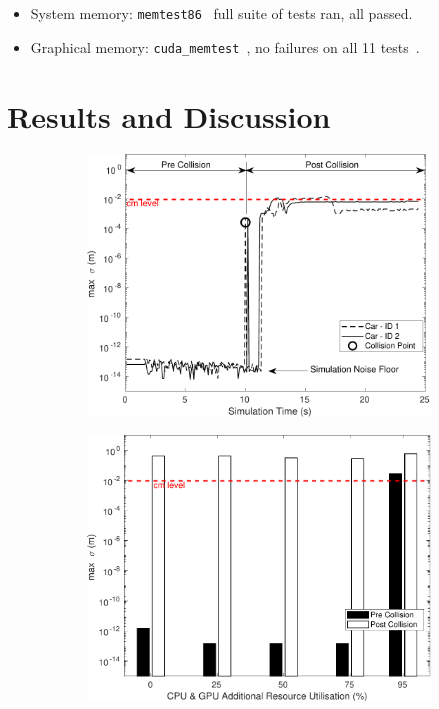 \begin{itemize}[leftmargin=*]
    \item System memory: \texttt{memtest86}~\cite{MemTest86} full suite of tests ran, all passed.
    \item Graphical memory: \texttt{cuda\_memtest}~\cite{cuda_memtest}, no failures on all 11 tests~\cite{shi2009testing}.
\end{itemize}

\section{Results and Discussion}\label{s:FinalResultsSection}

\begin{figure}[t]
    \centering
    \begin{subfigure}{.49\textwidth}
        \includegraphics[width=1\textwidth]{../other/figures/CarsCollisionCG25_V4.pdf}
        \caption{}
        \label{CarsCollisionCG25}
    \end{subfigure}
    \begin{subfigure}{.49\textwidth}
        \includegraphics[width=1\textwidth]{../other/figures/CarsCollisionPrePostV5.pdf}

\end{subfigure}
\end{figure}

